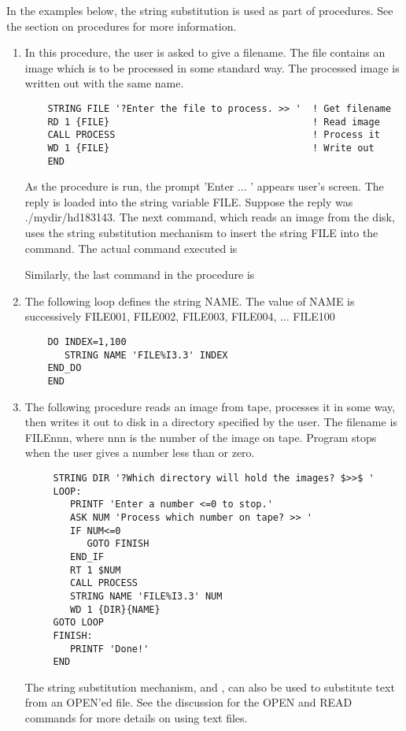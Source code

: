 In the examples below, the string substitution is used as part of
procedures.  See the section on procedures for more information.
\begin{enumerate}
  \item{In this procedure, the user is asked to give a filename.  The file
       contains an image which is to be processed in some standard way.
       The processed image is written out with the same name.
  \begin{verbatim}
    STRING FILE '?Enter the file to process. >> '  ! Get filename
    RD 1 {FILE}                                    ! Read image
    CALL PROCESS                                   ! Process it
    WD 1 {FILE}                                    ! Write out
    END
  \end{verbatim}
  As the procedure is run, the prompt 'Enter ... ' appears user's screen.
  The reply is loaded into the string variable FILE.  Suppose the reply was
  ./mydir/hd183143.  The next command, which reads an image from the disk,
  uses the string substitution mechanism to insert the string FILE into the
  command.  The actual command executed is
  Similarly, the last command in the procedure is
}

  \item{The following loop defines the string NAME.  The value of NAME
      is successively FILE001, FILE002, FILE003, FILE004, ... FILE100
  \begin{verbatim}
    DO INDEX=1,100
       STRING NAME 'FILE%I3.3' INDEX
    END_DO
    END
  \end{verbatim}
  }

  \item{The following procedure reads an image from tape, processes it in
        some way, then writes it out to disk in a directory specified by
        the user.  The filename is FILEnnn, where nnn is the number of the
        image on tape.  Program stops when the user gives a number less
        than or zero.
  \begin{verbatim}
     STRING DIR '?Which directory will hold the images? $>>$ ' 
     LOOP:
        PRINTF 'Enter a number <=0 to stop.'
        ASK NUM 'Process which number on tape? >> '
        IF NUM<=0
           GOTO FINISH
        END_IF
        RT 1 $NUM
        CALL PROCESS
        STRING NAME 'FILE%I3.3' NUM
        WD 1 {DIR}{NAME}
     GOTO LOOP
     FINISH:
        PRINTF 'Done!'
     END
  \end{verbatim}
  The string substitution mechanism, { and }, can also be used to
  substitute text from an OPEN'ed file.  See the discussion for the OPEN
  and READ commands for more details on using text files.  }
\end{enumerate}

